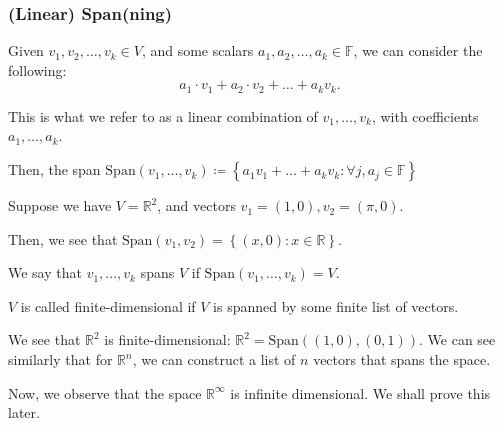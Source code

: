 \documentclass[openany]{book}
\newcommand{\RR}{\mathbb{R}}
\newcommand{\Span}{\mathrm{Span}}
\begin{document}
	\subsubsection{(Linear) Span(ning)}
	\begin{defn}[Span]
		Given $v_{1}, v_{2}, \ldots, v_{k} \in V$, and some scalars $a_{1}, a_{2}, \ldots, a_{k} \in \mathbb{F}$, we can consider the following:
		\begin{equation*}
			a_{1} \cdot v_{1} + a_{2} \cdot v_{2} + \ldots + a_{k} v_{k}.
		\end{equation*}
		
		This is what we refer to as a linear combination of $v_{1}, \ldots, v_{k}$, with coefficients $a_{1}, \ldots, a_{k}$.
		
		Then, the span $\mathrm{Span}(v_{1}, \ldots, v_{k}) \coloneq \left\{  a_{1}v_{1} + \ldots + a_{k}v_{k} : \forall j, a_{j} \in \mathbb{F} \right\}$
	\end{defn}
	
	\begin{example}
		Suppose we have $V = \RR^{2}$, and vectors $v_{1} = \left( 1,0 \right), v_{2} = \left( \pi, 0 \right)$.
		
		Then, we see that $\mathrm{Span}(v_{1}, v_{2}) = \left\{  (x,0) : x \in \RR \right\}$.
	\end{example}
	
	We say that $v_{1}, \ldots, v_{k}$ spans $V$ if $\mathrm{Span}(v_{1}, \ldots, v_{k}) = V$.
	
	\begin{defn}
		$V$ is called finite-dimensional if $V$ is spanned by some finite list of vectors.
	\end{defn}
	\begin{example}
		We see that $\RR^{2}$ is finite-dimensional: $\RR^{2} = \Span\left( (1,0), (0,1) \right)$. We can see similarly that for $\RR^{n}$, we can construct a list of $n$ vectors that spans the space.
		
		Now, we observe that the space $\RR^{\infty}$ is infinite dimensional. We shall prove this later.
	\end{example}
	
\end{document}
